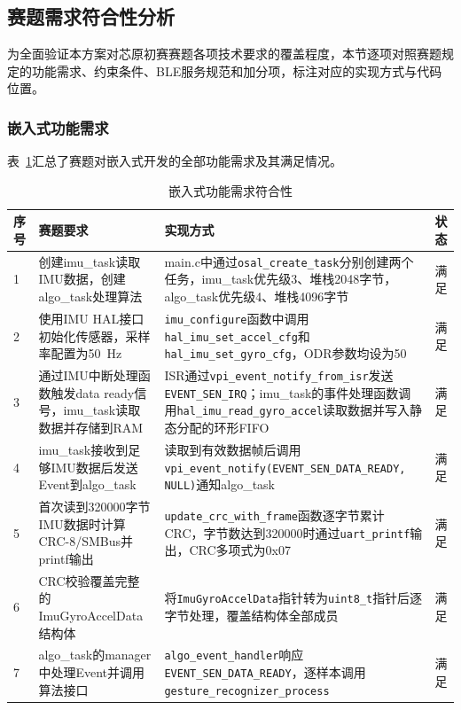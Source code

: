 \documentclass[lettersize,journal]{IEEEtran}
\begin{document}
\subsection{赛题需求符合性分析}

为全面验证本方案对芯原初赛赛题各项技术要求的覆盖程度，本节逐项对照赛题规定的功能需求、约束条件、BLE服务规范和加分项，标注对应的实现方式与代码位置。

\subsubsection{嵌入式功能需求}

表~\ref{tab:req_embedded}汇总了赛题对嵌入式开发的全部功能需求及其满足情况。

\begin{table}[!t]
    \centering
    \caption{嵌入式功能需求符合性}
    \label{tab:req_embedded}
    \begin{tabular}{p{0.5cm}p{5.5cm}p{8.5cm}p{1.2cm}}
        \toprule
        \textbf{序号} & \textbf{赛题要求} & \textbf{实现方式} & \textbf{状态} \\
        \midrule
        1 & 创建imu\_task读取IMU数据，创建algo\_task处理算法 & main.c中通过\texttt{osal\_create\_task}分别创建两个任务，imu\_task优先级3、堆栈2048字节，algo\_task优先级4、堆栈4096字节 & 满足 \\
        2 & 使用IMU HAL接口初始化传感器，采样率配置为50~Hz & \texttt{imu\_configure}函数中调用\texttt{hal\_imu\_set\_accel\_cfg}和\texttt{hal\_imu\_set\_gyro\_cfg}，ODR参数均设为50 & 满足 \\
        3 & 通过IMU中断处理函数触发data ready信号，imu\_task读取数据并存储到RAM & ISR通过\texttt{vpi\_event\_notify\_from\_isr}发送\texttt{EVENT\_SEN\_IRQ}；imu\_task的事件处理函数调用\texttt{hal\_imu\_read\_gyro\_accel}读取数据并写入静态分配的环形FIFO & 满足 \\
        4 & imu\_task接收到足够IMU数据后发送Event到algo\_task & 读取到有效数据帧后调用\texttt{vpi\_event\_notify(EVENT\_SEN\_DATA\_READY, NULL)}通知algo\_task & 满足 \\
        5 & 首次读到320000字节IMU数据时计算CRC-8/SMBus并printf输出 & \texttt{update\_crc\_with\_frame}函数逐字节累计CRC，字节数达到320000时通过\texttt{uart\_printf}输出，CRC多项式为0x07 & 满足 \\
        6 & CRC校验覆盖完整的ImuGyroAccelData结构体 & 将\texttt{ImuGyroAccelData}指针转为\texttt{uint8\_t}指针后逐字节处理，覆盖结构体全部成员 & 满足 \\
        7 & algo\_task的manager中处理Event并调用算法接口 & \texttt{algo\_event\_handler}响应\texttt{EVENT\_SEN\_DATA\_READY}，逐样本调用\texttt{gesture\_recognizer\_process} & 满足 \\

\end{tabular}
\end{table}
\end{document}
